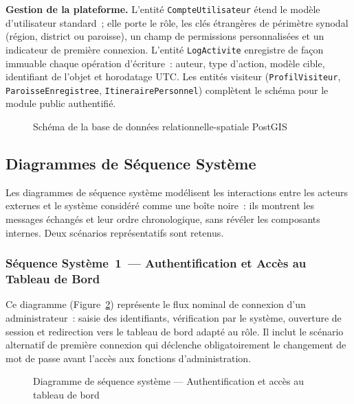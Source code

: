 \noindent\textbf{Gestion de la plateforme.}
L'entité \texttt{CompteUtilisateur} étend le modèle d'utilisateur standard~;
elle porte le rôle, les clés étrangères de périmètre synodal (région,
district ou paroisse), un champ de permissions personnalisées et un
indicateur de première connexion. L'entité \texttt{LogActivite} enregistre
de façon immuable chaque opération d'écriture~: auteur, type d'action,
modèle cible, identifiant de l'objet et horodatage UTC. Les entités visiteur
(\texttt{ProfilVisiteur}, \texttt{ParoisseEnregistree},
\texttt{ItinerairePersonnel}) complètent le schéma pour le module public
authentifié.

\begin{figure}[H]
  \centering
  \caption{Schéma de la base de données relationnelle-spatiale PostGIS}
  \label{fig:diag-bd}
\end{figure}

\subsection{Diagrammes de Séquence Système}
\label{ssec:seq-systeme}

Les diagrammes de séquence système modélisent les interactions entre les
acteurs externes et le système considéré comme une boîte noire~: ils montrent
les messages échangés et leur ordre chronologique, sans révéler les composants
internes. Deux scénarios représentatifs sont retenus.

\subsubsection{Séquence Système~1~--- Authentification et Accès au Tableau de Bord}

Ce diagramme (Figure~\ref{fig:seq-sys1}) représente le flux nominal de
connexion d'un administrateur~: saisie des identifiants, vérification par le
système, ouverture de session et redirection vers le tableau de bord adapté
au rôle. Il inclut le scénario alternatif de première connexion qui déclenche
obligatoirement le changement de mot de passe avant l'accès aux fonctions
d'administration.

\begin{figure}[H]
  \centering
  \caption{Diagramme de séquence système --- Authentification et accès au tableau de bord}
  \label{fig:seq-sys1}
\end{figure}

